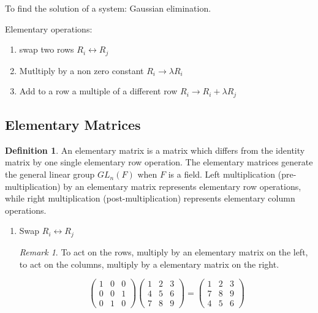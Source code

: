 \documentclass[12pt]{article}
\theoremstyle{definition}
\newtheorem{definition}{Definition}[section]
\theoremstyle{remark}
\newtheorem*{remark}{Remark}
\begin{document}
\begin{example}
    To find the solution of a system: Gaussian elimination. 

    Elementary operations:
    \begin{enumerate}
        \item swap two rows $R_i \leftrightarrow R_j$
        \item Mutltiply by a non zero constant $R_i \rightarrow \lambda R_i$ 
        \item Add to a row a multiple of a different row $R_i \rightarrow R_i + \lambda R_j$
    \end{enumerate}
\subsection{Elementary Matrices}
\begin{definition}
    An elementary matrix is a matrix which differs from the identity matrix by one single elementary row operation. 
    The elementary matrices generate the general linear group $GL_n(F)$ when $F $ is a field. Left multiplication
     (pre-multiplication) by an elementary matrix represents elementary row operations, while right multiplication 
     (post-multiplication) represents elementary column operations.
\end{definition}
\begin{enumerate}
    \item Swap $R_i \leftrightarrow R_j$
    \begin{remark}
        To act on the rows, multiply by an elementary matrix on the left, to act on the columns, multiply by a elementary matrix on the right.
        \begin{example}
            $$\begin{pmatrix}
                1&0&0\\
                0&0&1\\
                0&1&0
            \end{pmatrix} 
            \begin{pmatrix}
                1&2&3\\4&5&6\\7&8&9
            \end{pmatrix} = \begin{pmatrix}
                1&2&3\\7&8&9\\4&5&6
            \end{pmatrix}$$
        \end{example}

\end{remark}
\end{enumerate}
\end{example}
\end{document}
